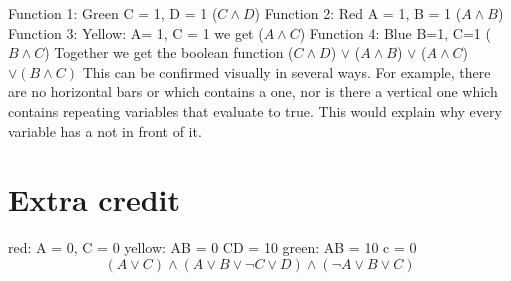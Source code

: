 \documentclass[11pt]{article}
\begin{document}
Function 1: Green
\newline
C = 1, D = 1 
\newline
($C \land D$) \newline
Function 2: Red
\newline
A = 1, B = 1
\newline
($ A \land B$) \newline
Function 3: Yellow: \newline
A= 1, C = 1 \newline
we get
\newline
($A\land C$)
\newline
Function 4: Blue\newline
B=1, C=1
($B \land C$)
\newline
Together we get the boolean function
($C \land D$) $\lor$ ($ A \land B$) $\lor$ ($A\land C$) $\lor (B \land C)$   \newline
This can be confirmed visually in several ways. For example, there are no horizontal bars or which contains a one, nor is there a vertical one which contains repeating variables that evaluate to true. This would explain why every variable has a not in front of it.





\section{Extra credit}


\begin{karnaugh-map}[4][4][1][$D$][$C$][$B$][$A$]

\end{karnaugh-map}
red: A = 0, C = 0 \newline yellow: AB = 0 CD = 10 \newline green: AB = 10 c = 0
\newline
\begin{displaymath} 
    (A \lor C) \land (A \lor B \lor \lnot C  \lor D) \land (\lnot A \lor B \lor C)
\end{displaymath}
\end{document}
